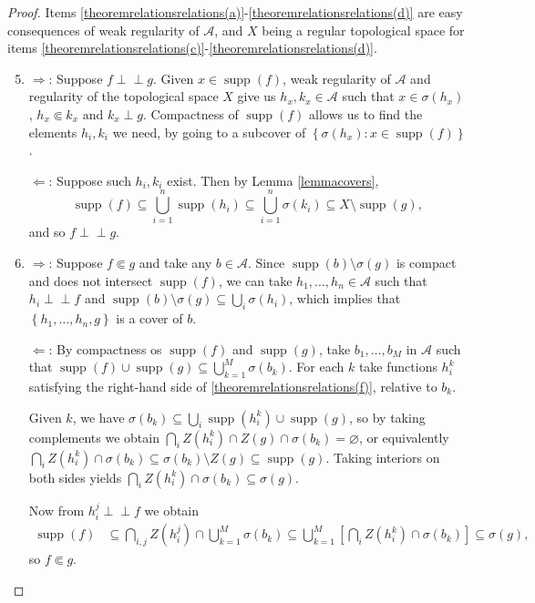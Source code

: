 \documentclass[letter,11pt]{amsart}
\theoremstyle{plain}		\newtheorem{theorem}[generalnumbering]{Theorem}
\theoremstyle{plain}		\newtheorem{corollary}[generalnumbering]{Corollary}
\theoremstyle{definition}		\newtheorem{definition}[generalnumbering]{Definition}
\theoremstyle{definition}		\newtheorem{example}[generalnumbering]{Example}
\theoremstyle{plain}		\newtheorem{proposition}[generalnumbering]{Proposition}
\theoremstyle{plain}		\newtheorem{lemma}[generalnumbering]{Lemma}
\theoremstyle{definition}
\newcommand{\perpp}{\perp\!\!\!\perp}
\DeclareMathOperator{\supp}{supp}
\begin{document}
\begin{proof}
	Items \ref{theoremrelationsrelations(a)}-\ref{theoremrelationsrelations(d)} are easy consequences of weak regularity of $\mathcal{A}$, and $X$ being a regular topological space for items \ref{theoremrelationsrelations(c)}-\ref{theoremrelationsrelations(d)}.
	\begin{enumerate}[label=\ref{theoremrelationsrelations(\alph*)}]\setcounter{enumi}{4}
		\item $\Rightarrow$: Suppose $f\perpp g$. Given $x\in \supp(f)$, weak regularity of $\mathcal{A}$ and regularity of the topological space $X$ give us $h_x,k_x\in\mathcal{A}$ such that $x\in\sigma(h_x)$, $h_x\Subset k_x$ and $k_x\perp g$. Compactness of $\supp(f)$ allows us to find the elements $h_i,k_i$ we need, by going to a subcover of $\left\{\sigma(h_x):x\in\supp(f)\right\}$.
		
		$\Leftarrow$: Suppose such $h_i,k_i$ exist. Then by Lemma \ref{lemmacovers},
		\[\supp(f)\subseteq\bigcup_{i=1}^n\supp(h_i)\subseteq\bigcup_{i=1}^n\sigma(k_i)\subseteq X\setminus\supp(g),\]
		and so $f\perpp g$.
		\item $\Rightarrow$: Suppose $f\Subset g$ and take any $b\in\mathcal{A}$. Since $\supp(b)\setminus\sigma(g)$ is compact and does not intersect $\supp(f)$, we can take $h_1,\ldots,h_n\in\mathcal{A}$ such that $h_i\perpp f$ and $\supp(b)\setminus\sigma(g)\subseteq\bigcup_i\sigma(h_i)$, which implies that $\left\{h_1,\ldots,h_n,g\right\}$ is a cover of $b$.
		
		$\Leftarrow$: By compactness os $\supp(f)$ and $\supp(g)$, take $b_1,\ldots,b_M$ in $\mathcal{A}$ such that $\supp(f)\cup\supp(g)\subseteq\bigcup_{k=1}^M\sigma(b_k)$. For each $k$ take functions $h_i^k$ satisfying the right-hand side of \ref{theoremrelationsrelations(f)}, relative to $b_k$.
		
		Given $k$, we have $\sigma(b_k)\subseteq\bigcup_i\supp(h_i^k)\cup\supp(g)$, so by taking complements we obtain $\bigcap_iZ(h_i^k)\cap Z(g)\cap\sigma(b_k)=\varnothing$, or equivalently $\bigcap_iZ(h_i^k)\cap\sigma(b_k)\subseteq\sigma(b_k)\setminus Z(g)\subseteq\supp(g)$. Taking interiors on both sides yields $\bigcap_iZ(h_i^k)\cap\sigma(b_k)\subseteq\sigma(g)$.
		
		Now from $h_i^j\perpp f$ we obtain
		\begin{align*}
		\supp(f)&\subseteq\bigcap_{i,j}Z(h_i^j)\cap\bigcup_{k=1}^M\sigma(b_k)\subseteq\bigcup_{k=1}^M\left[\bigcap_i Z(h_i^k)\cap\sigma(b_k)\right]\subseteq \sigma(g),
		\end{align*}
		so $f\Subset g$.\qedhere
	\end{enumerate}
\end{proof}
\end{document}
